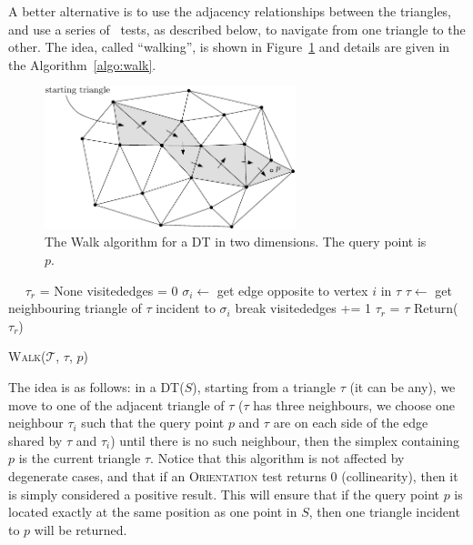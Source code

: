A better alternative is to use the adjacency relationships between the triangles, and use a series of \Orient\ tests, as described below, to navigate from one triangle to the other. 
The idea, called ``walking'', is shown in Figure~\ref{fig:walk} and details are given in the Algorithm~\ref{algo:walk}.
\begin{figure}
  \centering
  \includegraphics[width=0.65\textwidth]{figs/walk}
  \caption{The Walk algorithm for a DT in two dimensions. The query point is $p$.}%
\label{fig:walk}
\end{figure}
\begin{algorithm}[t]
  \DontPrintSemicolon\
  \KwOut{$\tau_r$: the triangle in $\mathcal{T}$ containing $p$}
  \BlankLine\ 
  $\tau_r$ = None\;
  {
    visitededges = 0\;
    {
      $\sigma_i \leftarrow$ get edge opposite to vertex $i$ in $\tau$\;
      {
        $\tau \leftarrow$ get neighbouring triangle of $\tau$ incident to $\sigma_i$\;
        break\;
      }
      visitededges += 1\;
    }  
    {
      $\tau_r$ = $\tau$\;
    }
  }
  Return($\tau_r$)
  \caption{W\textsc{alk}($\mathcal{T}$, $\tau$, $p$)}%
\label{algo:walk}
\end{algorithm}
The idea is as follows: in a DT($S$), starting from a triangle $\tau$ (it can be any), we move to one of the adjacent triangle of $\tau$ ($\tau$ has three neighbours, we choose one neighbour $\tau_i$ such that the query point $p$ and $\tau$ are on each side of the edge shared by $\tau$ and $\tau_i$) until there is no such neighbour, then the simplex containing $p$ is the current triangle $\tau$.
Notice that this algorithm is not affected by degenerate cases, and that if an \textrm{O}\textsc{rientation} test returns 0 (collinearity), then it is simply considered a positive result. 
This will ensure that if the query point $p$ is located exactly at the same position as one point in $S$, then one triangle incident to $p$ will be returned.


